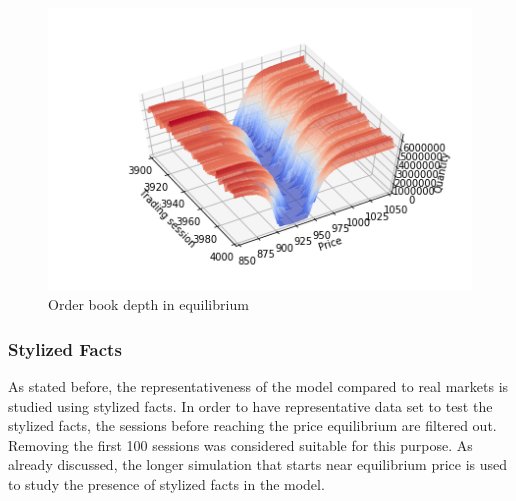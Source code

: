 \begin{figure}
    \includegraphics[width=\linewidth]{plots/basic_market_depth_in_equilibrium.png}
    \caption{Order book depth in equilibrium}
    \label{fig:basic_orderbook_evo}
\end{figure}


\subsubsection{Stylized Facts}
As stated before, the representativeness of the model compared to real markets 
is studied using stylized facts. In order to have representative data set to 
test the stylized facts, the sessions before reaching the price equilibrium are filtered out.
Removing the first 100 sessions was considered suitable for this purpose. 
As already discussed, the longer simulation that starts near equilibrium 
price is used to study the presence of stylized facts in the model. 

